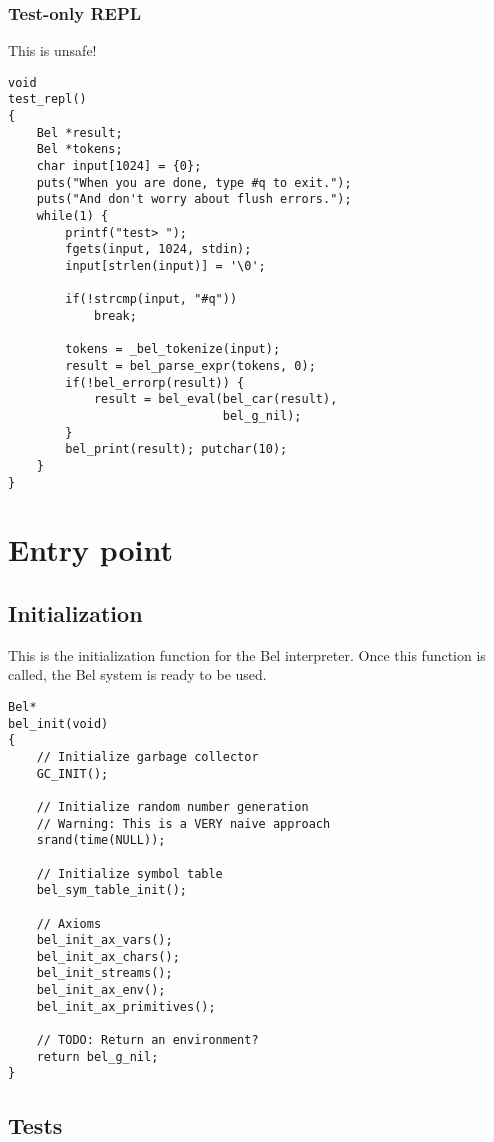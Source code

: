 \documentclass[openright,a4paper,twoside,12pt]{memoir}
\begin{document}
\subsection{Test-only REPL}
\label{sec:org95c3d07}

This is unsafe!

\begin{verbatim}
void
test_repl()
{
    Bel *result;
    Bel *tokens;
    char input[1024] = {0};
    puts("When you are done, type #q to exit.");
    puts("And don't worry about flush errors.");
    while(1) {
        printf("test> ");
        fgets(input, 1024, stdin);
        input[strlen(input)] = '\0';

        if(!strcmp(input, "#q"))
            break;

        tokens = _bel_tokenize(input);
        result = bel_parse_expr(tokens, 0);
        if(!bel_errorp(result)) {
            result = bel_eval(bel_car(result),
                              bel_g_nil);
        }
        bel_print(result); putchar(10);
    }
}
\end{verbatim}

\chapter{Entry point}
\label{sec:org957f4b2}
\section{Initialization}
\label{sec:org8c66fe6}

This is the initialization function for the Bel interpreter. Once this
function is called, the Bel system is ready to be used.

\begin{verbatim}
Bel*
bel_init(void)
{
    // Initialize garbage collector
    GC_INIT();

    // Initialize random number generation
    // Warning: This is a VERY naive approach
    srand(time(NULL));

    // Initialize symbol table
    bel_sym_table_init();

    // Axioms
    bel_init_ax_vars();
    bel_init_ax_chars();
    bel_init_streams();
    bel_init_ax_env();
    bel_init_ax_primitives();

    // TODO: Return an environment?
    return bel_g_nil;
}
\end{verbatim}

\section{Tests}
\label{sec:orge3fa4fa}
\end{document}
